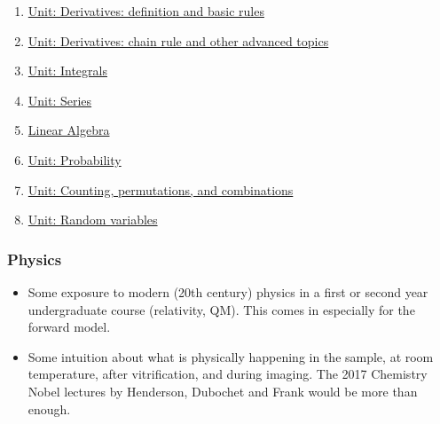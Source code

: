 \documentclass[11pt, oneside]{article}   	%
\begin{document}
\begin{enumerate}
	\item \href{https://www.khanacademy.org/math/differential-calculus/dc-diff-intro}{Unit: Derivatives: definition and basic rules} 
	\item \href{https://www.khanacademy.org/math/differential-calculus/dc-chain}{Unit: Derivatives: chain rule and other advanced topics}
	\item \href{https://www.khanacademy.org/math/integral-calculus/ic-integration} {Unit: Integrals}
	\item \href{https://www.khanacademy.org/math/integral-calculus/ic-series}{Unit: Series}
	\item \href{https://www.khanacademy.org/math/linear-algebra}{Linear Algebra}
	\item \href{https://www.khanacademy.org/math/statistics-probability/probability-library}{Unit: Probability}
	\item \href{https://www.khanacademy.org/math/statistics-probability/counting-permutations-and-combinations}{Unit: Counting, permutations, and combinations}
	\item \href{https://www.khanacademy.org/math/statistics-probability/random-variables-stats-library}{Unit: Random variables}
\end{enumerate}

\subsubsection{Physics}
\begin{itemize}
	\item Some exposure to modern (20th century) physics in a first or second year undergraduate course (relativity, QM). This comes in especially for the forward model.
	\item Some intuition about what is physically happening in the sample, at room temperature, after vitrification, and during imaging. The 2017 Chemistry Nobel lectures by Henderson, Dubochet and Frank would be more than enough.
\end{itemize}
\end{document}
